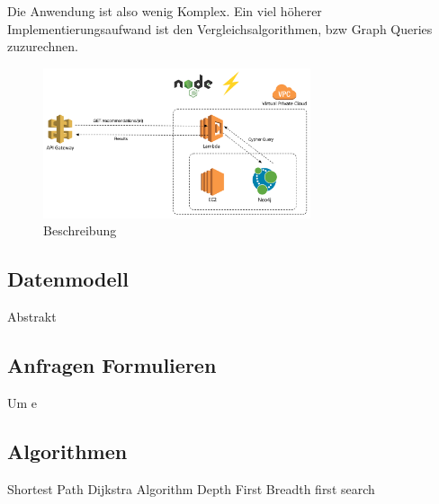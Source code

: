 Die Anwendung ist also wenig Komplex. Ein viel höherer Implementierungsaufwand ist den Vergleichsalgorithmen, bzw Graph Queries zuzurechnen. 

\begin{figure}[htb]
 \centering
 \includegraphics[width=0.7\textwidth,angle=0]{abb/Architecture}
 \caption[Beschreibung]{Beschreibung}
\label{fig:Beschreibung}
\end{figure}

\subsection{Datenmodell}

Abstrakt 
\subsection{Anfragen Formulieren}

Um e
\subsection{Algorithmen}

Shortest Path
Dijkstra Algorithm
Depth First
Breadth first search
